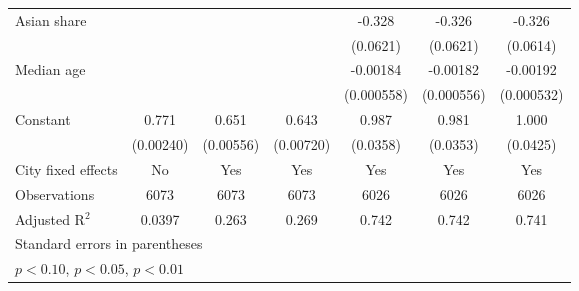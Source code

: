 {\begin{tabular}{l*{6}{c}}
\addlinespace
Asian share         &                     &                     &                     &      -0.328\sym{***}&      -0.326\sym{***}&      -0.326\sym{***}\\
                    &                     &                     &                     &    (0.0621)         &    (0.0621)         &    (0.0614)         \\
\addlinespace
Median age          &                     &                     &                     &    -0.00184\sym{***}&    -0.00182\sym{***}&    -0.00192\sym{***}\\
                    &                     &                     &                     &  (0.000558)         &  (0.000556)         &  (0.000532)         \\
\addlinespace
Constant            &       0.771\sym{***}&       0.651\sym{***}&       0.643\sym{***}&       0.987\sym{***}&       0.981\sym{***}&       1.000\sym{***}\\
                    &   (0.00240)         &   (0.00556)         &   (0.00720)         &    (0.0358)         &    (0.0353)         &    (0.0425)         \\
\midrule
City fixed effects  &          No         &         Yes         &         Yes         &         Yes         &         Yes         &         Yes         \\
Observations        &        6073         &        6073         &        6073         &        6026         &        6026         &        6026         \\
Adjusted R$^2$      &      0.0397         &       0.263         &       0.269         &       0.742         &       0.742         &       0.741         \\
\bottomrule
\multicolumn{7}{l}{\footnotesize Standard errors in parentheses}\\
\multicolumn{7}{l}{\footnotesize \sym{*} \(p<0.10\), \sym{**} \(p<0.05\), \sym{***} \(p<0.01\)}\\
\end{tabular}
}
